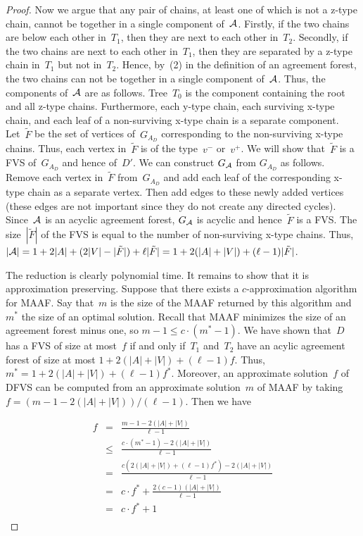 \begin{proof}
Now we argue that any pair of chains, {at least} one of which is not a z-type chain, cannot be together in a single component of~${\mathcal A}$. Firstly, if the two chains are below each other in~$T_1$, then they are next to each other in~$T_2$. Secondly, if the two chains are next to each other in~$T_1$, then they are separated by a z-type chain in~$T_1$ but not in~$T_2$. Hence, by~(2) in the definition of an agreement forest, the two chains can not be together in a single component of~${\mathcal A}$. Thus, the components of~${\mathcal A}$ are as follows. Tree~$T_0$ is the component containing the root and all z-type chains. Furthermore, each y-type chain, each surviving x-type chain, and each leaf of a non-surviving x-type chain is a separate component. Let~$\tilde{F}$ be the set of vertices of~$G_{A_D}$ corresponding to the non-surviving x-type chains. Thus, each vertex in~$\tilde{F}$ is of the type~$v^-$ or~$v^+$. We will show that~$\tilde{F}$ is a FVS of~$G_{A_D}$ and hence of~$D'$. We can construct $G_{{\mathcal A}}$ 
from $G_{A_D}$ as follows. Remove each vertex in~$\tilde{F}$ from~$G_{A_D}$ and add each leaf of the corresponding x-type chain as a separate vertex. Then add edges to these newly added vertices (these edges are not important since they do not create any directed cycles). Since~${\mathcal A}$ is an acyclic agreement forest, $G_{\mathcal A}$ is acyclic and hence~$\tilde{F}$ is a FVS. The size~$|\tilde{F}|$ of the FVS is equal to the number of non-surviving x-type chains. Thus, $|{\mathcal A}| = 1+2|A|+(2|V|-|\tilde{F}|)+\ell|\tilde{F}| = 1+2(|A|+|V|)+(\ell-1)|\tilde{F}|$.

The reduction is clearly polynomial time. It remains to show that it is approximation preserving. Suppose that there exists a $c$-approximation algorithm for {\sc MAAF}. Say that~$m$ is the size of the MAAF returned by this algorithm and~$m^*$ the size of an optimal solution. Recall that {\sc MAAF} minimizes the size of an agreement forest minus one, so $m-1\leq c\cdot (m^*-1)$. We have shown that~$D$ has a FVS of size at most~$f$ if and only if~$T_1$ and~$T_2$ have an acylic agreement forest of size at most $1+2(|A|+|V|)+(\ell-1)f$. Thus, $m^*=1+2(|A|+|V|)+(\ell-1)f^*$. Moreover, an approximate solution~$f$ of DFVS can be computed from an approximate solution~$m$ of MAAF by taking $f = ( m - 1 - 2(|A|+|V|) ) / (\ell-1)$. Then we have

\begin{eqnarray*}
f & = & \frac{m - 1 - 2(|A|+|V|)}{\ell-1}\\
& \leq & \frac{c\cdot (m^* - 1) - 2(|A|+|V|)}{\ell-1}\\
& = & \frac{c(2(|A|+|V|)+(\ell-1)f^*)-2(|A|+|V|)}{\ell-1}\\
& = & c\cdot f^* + \frac{2(c-1)(|A|+|V|)}{\ell-1}\\
& = & c\cdot f^* + 1\\
\end{eqnarray*}


\end{proof}
